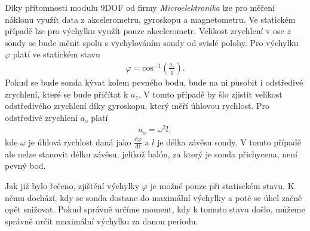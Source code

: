 \documentclass[twoside]{ctuthesis}
\newcommand{\diff}{\text{d}}
\theoremstyle{plain}
\theoremstyle{definition}
\theoremstyle{note}
\begin{document}
	Díky přítomnosti modulu 9DOF od firmy \textit{Microelektronika} lze pro měření náklonu využít data z akcelerometru, gyroskopu a magnetometru. Ve statickém případě lze pro výchylku využít pouze akcelerometr. Velikost zrychlení v ose $z$ sondy se bude měnit spolu s vychylováním sondy od svislé polohy. Pro výchylku $\varphi$ platí ve statickém stavu
	\begin{align}
		\varphi = \text{cos}^{-1}\left(\frac{a_z}{g}\right).
	\end{align}
	Pokud se bude sonda kývat kolem pevného bodu, bude na ni působit i odstředivé zrychlení, které se bude přičítat k $a_z$. V tomto případě by šlo zjistit velikost odstředivého zrychlení díky gyroskopu, který měří úhlovou rychlost. Pro odstředivé zrychlení $a_\text{o}$ platí
	\begin{align}
		a_\text{o} = \omega^2 l,
	\end{align}
	kde $\omega$ je úhlová rychlost daná jako $\frac{\diff \varphi}{\diff t}$ a $l$ je délka závěsu sondy. V tomto případě ale nelze stanovit délku závěsu, jelikož balón, za který je sonda přichycena, není pevný bod.

	Jak již bylo řečeno, zjištění výchylky $\varphi$ je možné pouze při statisckém stavu. K němu dochází, kdy se sonda dostane do maximální výchylky a poté se úhel začně opět snižovat. Pokud správně určíme moment, kdy k tomuto stavu došlo, můžeme správně určit maximální výchylku za danou periodu. 
\end{document}
